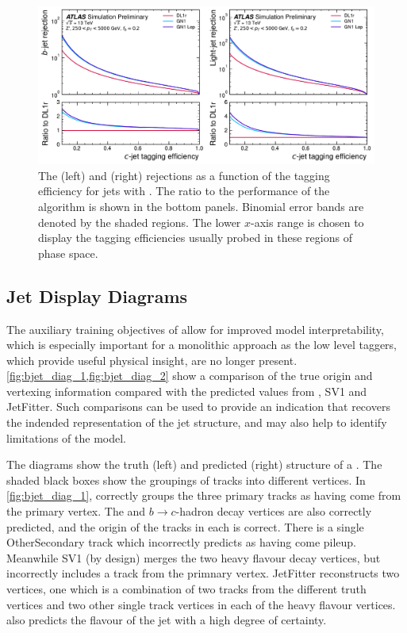 \begin{figure}[!p]
   \centering
   \includegraphics[width=\textwidth]{chapters/gnn_tagger/figs/results/main/zprime/zprime_roc_ctag.pdf}
   \caption{
        The \bjet (left) and \ljet (right) rejections as a function of the \cjet tagging efficiency for \Zprime jets with \Zprimept.
        The ratio to the performance of the \DLr algorithm is shown in the bottom panels.
        Binomial error bands are denoted by the shaded regions.
        The lower $x$-axis range is chosen to display the \cjet tagging efficiencies usually probed in these regions of phase space.
    }
   \label{fig:zprime_ctag_roc}
\end{figure}



\subsection{Jet Display Diagrams}

The auxiliary training objectives of \GNN allow for improved model interpretability, which is especially important for a monolithic approach as the low level taggers, which provide useful physical insight, are no longer present.
\cref{fig:bjet_diag_1,fig:bjet_diag_2} show a comparison of the true origin and vertexing information compared with the predicted values from \GNN, SV1 and JetFitter.
Such comparisons can be used to provide an indication that \GNN recovers the indended representation of the jet structure, and may also help to identify limitations of the model.

The diagrams show the truth (left) and predicted (right) structure of a \bjet.
The shaded black boxes show the groupings of tracks into different vertices.
In \cref{fig:bjet_diag_1}, \GNN correctly groups the three primary tracks as having come from the primary vertex.
The \bhadron and $b\rightarrow c$-hadron decay vertices are also correctly predicted, and the origin of the tracks in each is correct.
There is a single OtherSecondary track which \GNN incorrectly predicts as having come pileup.
Meanwhile SV1 (by design) merges the two heavy flavour decay vertices, but incorrectly includes a track from the primnary vertex.
JetFitter reconstructs two vertices, one which is a combination of two tracks from the different truth vertices and two other single track vertices in each of the heavy flavour vertices.
\GNN also predicts the flavour of the jet with a high degree of certainty.

